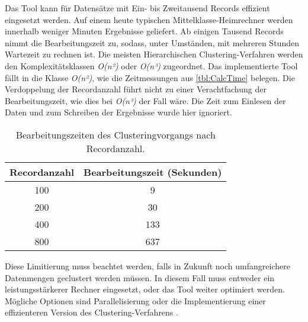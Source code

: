 Das Tool kann für Datensätze mit Ein- bis Zweitausend Records effizient eingesetzt werden.
Auf einem heute typischen Mittelklasse-Heimrechner werden innerhalb weniger Minuten Ergebnisse geliefert.
Ab einigen Tausend Records nimmt die Bearbeitungszeit zu,
sodass, unter Umständen, mit mehreren Stunden Wartezeit zu rechnen ist.
Die meisten Hierarchischen Clustering-Verfahren werden den Komplexitätsklassen
\emph{O(n²)} oder \emph{O(n³)} zugeordnet.
Das implementierte Tool fällt in die Klasse \emph{O(n²)},
wie die Zeitmessungen aus \autoref{tbl:CalcTime} belegen.
Die Verdoppelung der Recordanzahl führt nicht zu einer Verachtfachung der Bearbeitungszeit,
wie dies bei \emph{O(n³)} der Fall wäre.
Die Zeit zum Einlesen der Daten
und zum Schreiben der Ergebnisse wurde hier ignoriert.
\begin{table}[ht]
  \begin{center}
  \begin{tabular}{ |c|c| } 
   \hline
   Recordanzahl & Bearbeitungszeit (Sekunden) \\
   \hline \hline
   100 & 9 \\
   \hline
   200 & 30 \\
   \hline
   400 & 133 \\
   \hline
   800 & 637 \\
   \hline
  \end{tabular}
  \caption{Bearbeitungszeiten des Clusteringvorgangs nach Recordanzahl.}
  \label{tbl:CalcTime}
  \end{center}
\end{table}
Diese Limitierung muss beachtet werden,
falls in Zukunft noch umfangreichere Datenmengen geclustert werden müssen.
In diesem Fall muss entweder ein leistungsstärkerer Rechner eingesetzt,
oder das Tool weiter optimiert werden.
Mögliche Optionen sind Parallelisierung
oder die Implementierung einer effizienteren Version des Clustering-Verfahrens \citep{patel_study_2015}.


